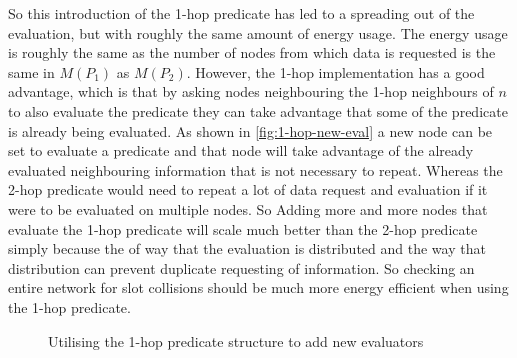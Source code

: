 So this introduction of the 1-hop predicate has led to a spreading out of the evaluation, but with roughly the same amount of energy usage. The energy usage is roughly the same as the number of nodes from which data is requested is the same in $M(P_{1})$ as $M(P_{2})$. However, the 1-hop implementation has a good advantage, which is that by asking nodes neighbouring the 1-hop neighbours of $n$ to also evaluate the predicate they can take advantage that some of the predicate is already being evaluated. As shown in \autoref{fig:1-hop-new-eval} a new node can be set to evaluate a predicate and that node will take advantage of the already evaluated neighbouring information that is not necessary to repeat. Whereas the 2-hop predicate would need to repeat a lot of data request and evaluation if it were to be evaluated on multiple nodes. So Adding more and more nodes that evaluate the 1-hop predicate will scale much better than the 2-hop predicate simply because the of way that the evaluation is distributed and the way that distribution can prevent duplicate requesting of information. So checking an entire network for slot collisions should be much more energy efficient when using the 1-hop predicate.


\begin{figure}[H]
\centering
{}\hspace{3em}
\caption{Utilising the 1-hop predicate structure to add new evaluators}
\label{fig:1-hop-new-eval}
\end{figure}


